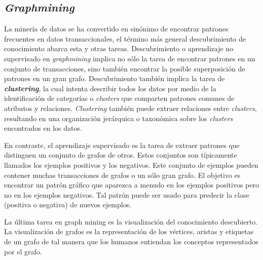 \subsection{\textit{Graphmining}}
La minería de datos se ha convertido en sinónimo de encontrar patrones frecuentes en datos transaccionales, el término más general descubrimiento de conocimiento abarca esta y otras tareas. Descubrimiento o aprendizaje no supervisado en \textit{graphmining} implica no sólo la tarea de encontrar patrones en un conjunto de transacciones, sino también encontrar la posible superposición de patrones en un gran grafo. Descubrimiento también implica la tarea de \textbf{\textit{clustering}}, la cual intenta describir todos los datos por medio de la identificación de categorías o \textit{clusters} que comparten patrones comunes de atributos y relaciones. \textit{Clustering} también puede extraer relaciones entre \textit{clusters}, resultando en una organización jerárquica o taxonómica  sobre los \textit{clusters} encontrados en los datos.\cite{Cook2006}
 
En contraste, el aprendizaje supervisado es la tarea de extraer patrones que distinguen un conjunto de grafos de otros. Estos conjuntos son típicamente llamados los ejemplos positivos y los negativos. Este conjunto de ejemplos pueden contener muchas transacciones de grafos o un sólo gran grafo. El objetivo es encontrar un patrón gráfico que aparezca a menudo en los ejemplos positivos pero no en los ejemplos negativos. Tal patrón puede ser usado para predecir la clase (positiva o negativa) de nuevos ejemplos. \cite{Cook2006}
 
La última tarea en graph mining es la visualización del conocimiento descubierto. La visualización de grafos es la representación de los vértices, aristas y etiquetas de un grafo de tal manera que los humanos entiendan los conceptos representados por el grafo.\cite{Cook2006}

